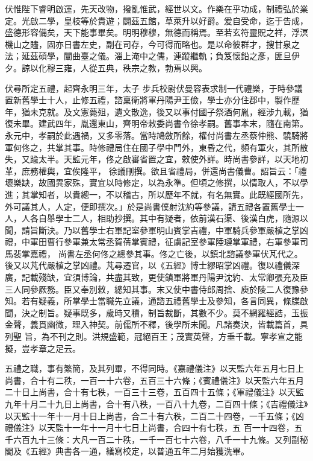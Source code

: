 \begin{pinyinscope}
 伏惟陛下睿明啟運，先天改物，撥亂惟武，經世以文。作樂在乎功成，制禮弘於業定。光啟二學，皇枝等於貴遊；闢茲五館，草萊升以好爵。爰自受命，迄于告成，盛德形容備矣，天下能事畢矣。明明穆穆，無德而稱焉。至若玄符靈貺之祥，浮溟機山之贐，固亦日書左史，副在司存，今可得而略也。是以命彼群才，搜甘泉之法；延茲碩學，闡曲臺之儀。淄上淹中之儒，連蹤繼軌；負笈懷鉛之彥，匪旦伊夕。諒以化穆三雍，人從五典，秩宗之教，勃焉以興。



 伏尋所定五禮，起齊永明三年，太子
 步兵校尉伏曼容表求制一代禮樂，于時參議置新舊學士十人，止修五禮，諮稟衛將軍丹陽尹王儉，學士亦分住郡中，製作歷年，猶未克就。及文憲薨殂，遺文散逸，後又以事付國子祭酒何胤，經涉九載，猶復未畢。建武四年，胤還東山，齊明帝敕委尚書令徐孝嗣。舊事本末，隨在南第。永元中，孝嗣於此遇禍，又多零落。當時鳩斂所餘，權付尚書左丞蔡仲熊、驍騎將軍何佟之，共掌其事。時修禮局住在國子學中門外，東昏之代，頻有軍火，其所散失，又踰太半。天監元年，佟之啟審省置之宜，敕使外詳。時尚書參詳，以天地初革，庶務權輿，宜俟隆平，
 徐議刪撰。欲且省禮局，併還尚書儀曹。詔旨云：「禮壞樂缺，故國異家殊，實宜以時修定，以為永準。但頃之修撰，以情取人，不以學進；其掌知者，以貴總一，不以稽古，所以歷年不就，有名無實。此既經國所先，外可議其人，人定，便即撰次。」於是尚書僕射沈約等參議，請五禮各置舊學士一人，人各自舉學士二人，相助抄撰。其中有疑者，依前漢石渠、後漢白虎，隨源以聞，請旨斷決。乃以舊學士右軍記室參軍明山賓掌吉禮，中軍騎兵參軍嚴植之掌凶禮，中軍田曹行參軍兼太常丞賀蒨掌賓禮，征虜記室參軍陸璉掌軍禮，右軍參軍司馬裴掌嘉禮，
 尚書左丞何佟之總參其事。佟之亡後，以鎮北諮議參軍伏芃代之。後又以芃代嚴植之掌凶禮。芃尋遷官，以《五經》博士繆昭掌凶禮。復以禮儀深廣，記載殘缺，宜須博論，共盡其致，更使鎮軍將軍丹陽尹沈約、太常卿張充及臣三人同參厥務。臣又奉別敕，總知其事。末又使中書侍郎周捨、庾於陵二人復豫參知。若有疑義，所掌學士當職先立議，通諮五禮舊學士及參知，各言同異，條牒啟聞，決之制旨。疑事既多，歲時又積，制旨裁斷，其數不少。莫不網羅經誥，玉振金聲，義貫幽微，理入神契。前儒所不釋，後學所未聞。凡諸奏決，皆載篇首，具列聖
 旨，為不刊之則。洪規盛範，冠絕百王；茂實英聲，方垂千載。寧孝宣之能擬，豈孝章之足云。



 五禮之職，事有繁簡，及其列畢，不得同時。《嘉禮儀注》以天監六年五月七日上尚書，合十有二秩，一百一十六卷，五百三十六條；《賓禮儀注》以天監六年五月二十日上尚書，合十有七秩，一百三十三卷，五百四十五條；《軍禮儀注》以天監九年十月二十九日上尚書，合十有八秩，一百八十九卷，二百四十條；《吉禮儀注》以天監十一年十一月十日上尚書，合二十有六秩，二百二十四卷，一千五條；《凶禮儀注》以天監十一年十一月十七日上尚書，合四十有七秩，五
 百一十四卷，五千六百九十三條：大凡一百二十秩，一千一百七十六卷，八千一十九條。又列副秘閣及《五經》典書各一通，繕寫校定，以普通五年二月始獲洗畢。




\end{pinyinscope}
